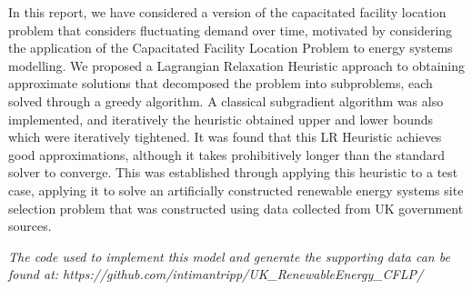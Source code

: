 In this report, we have considered a version of the 
capacitated facility location problem that considers
fluctuating demand over time, motivated by considering
the application of the Capacitated Facility Location Problem to energy systems modelling. 
We proposed a Lagrangian Relaxation Heuristic approach
to obtaining approximate solutions that decomposed the problem into subproblems, each solved through
a greedy algorithm. A classical subgradient algorithm  was also implemented, and iteratively 
the heuristic obtained upper and lower bounds 
which were iteratively tightened. It was found that this LR Heuristic achieves good approximations, 
although it takes prohibitively
longer than the standard solver to converge. This was established through applying this heuristic to 
a test case, applying it to solve an artificially constructed renewable energy systems site selection
problem that was constructed using data collected from UK government sources.  

\vspace{1em}
\textit{The code used to implement this model and generate 
the supporting data can be found at: https://github.com/intimantripp/UK\_RenewableEnergy\_CFLP/}